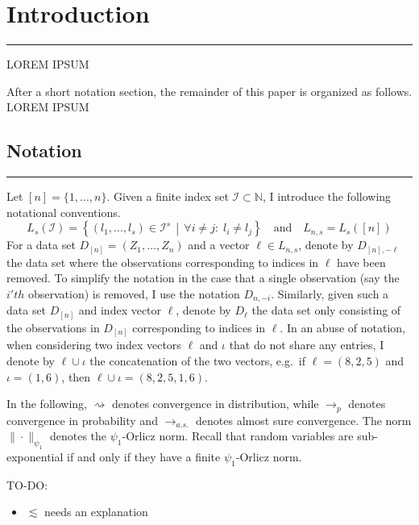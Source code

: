 \section{Introduction}
\hrule
	{\color{red} LOREM IPSUM}

After a short notation section, the remainder of this paper is organized as follows.
{\color{red} LOREM IPSUM}

\subsection{Notation}
\hrule
Let $[n] = \{1, \dotsc, n\}$.
Given a finite index set $\mathcal{I} \subset \mathbb{N}$, I introduce the following notational conventions.
\begin{equation}
	L_{s}(\mathcal{I}) = \left\{\left(l_1, \dotsc, l_s\right) \in \mathcal{I}^{s} \, \middle| \, \forall i \neq j: \; l_i \neq l_j\right\}
	\quad \text{and} \quad
	L_{n,s} = L_s\left([n]\right)
\end{equation}
For a data set $D_{[n]} = \left(Z_1, \dotsc, Z_{n}\right)$ and a vector $\ell \in L_{n,s}$, denote by $D_{[n], -\ell}$ the data set where the observations corresponding to indices in $\ell$ have been removed.
To simplify the notation in the case that a single observation (say the $i'th$ observation) is removed, I use the notation $D_{n, -i}$.
Similarly, given such a data set $D_{[n]}$ and index vector $\ell$, denote by $D_{\ell}$ the data set only consisting of the observations in $D_{[n]}$ corresponding to indices in $\ell$.
In an abuse of notation, when considering two index vectors $\ell$ and $\iota$ that do not share any entries, I denote by $\ell \cup \iota$ the concatenation of the two vectors, e.g.\ if $\ell = (8,2,5)$ and $\iota = (1,6)$, then $\ell \cup \iota = (8,2,5,1,6)$.

In the following, $\rightsquigarrow$ denotes convergence in distribution, while $\rightarrow_{p}$ denotes convergence in probability and $\rightarrow_{a.s.}$ denotes almost sure convergence.
The norm $\| \cdot \|_{\psi_1}$ denotes the $\psi_1$-Orlicz norm.
Recall that random variables are sub-exponential if and only if they have a finite $\psi_1$-Orlicz norm.

{\color{red} TO-DO:}
\begin{itemize}
	\item $\lesssim$ needs an explanation
\end{itemize}